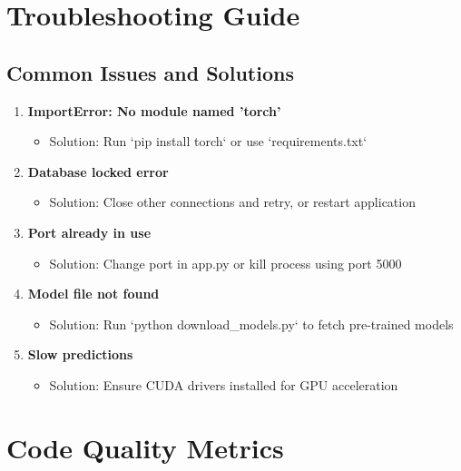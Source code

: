 \documentclass[12pt,a4paper,twoside]{report}
\begin{document}
\section{Troubleshooting Guide}

\subsection{Common Issues and Solutions}

\begin{enumerate}
    \item \textbf{ImportError: No module named 'torch'}
    \begin{itemize}
        \item Solution: Run `pip install torch` or use `requirements.txt`
    \end{itemize}
    
    \item \textbf{Database locked error}
    \begin{itemize}
        \item Solution: Close other connections and retry, or restart application
    \end{itemize}
    
    \item \textbf{Port already in use}
    \begin{itemize}
        \item Solution: Change port in app.py or kill process using port 5000
    \end{itemize}
    
    \item \textbf{Model file not found}
    \begin{itemize}
        \item Solution: Run `python download_models.py` to fetch pre-trained models
    \end{itemize}
    
    \item \textbf{Slow predictions}
    \begin{itemize}
        \item Solution: Ensure CUDA drivers installed for GPU acceleration
    \end{itemize}
\end{enumerate}

\section{Code Quality Metrics}
\end{document}

